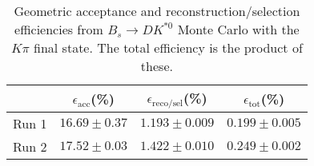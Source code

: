 \begin{table}
    \centering
    \begin{tabular}{cccc}
        \toprule
        & $\epsilon_\mathrm{acc}$(\%) &  $\epsilon_\mathrm{reco/sel}$(\%) &  $\epsilon_\mathrm{tot}$(\%) \\
        \midrule
        Run 1 & $16.69 \pm 0.37$ & $1.193 \pm 0.009$ & $0.199 \pm 0.005$ \\
        Run 2 & $17.52 \pm 0.03$ & $1.422 \pm 0.010$ & $0.249 \pm 0.002$ \\
        \bottomrule
    \end{tabular}
    \caption{Geometric acceptance and reconstruction/selection efficiencies from  $B_s \to DK^{*0}$ Monte Carlo with the $K\pi$ final state.  The total efficiency is the product of these.}
\label{tab:selection_efficiency_Bs}
\end{table}
